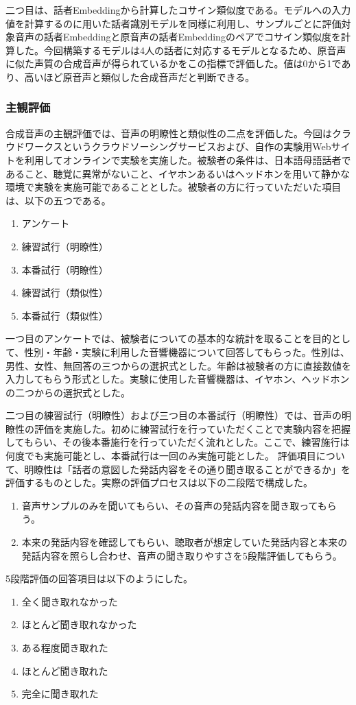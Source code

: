 \documentclass[12pt]{jarticle}
\numberwithin{equation}{section}    %
\numberwithin{figure}{section}      %
\numberwithin{table}{section}      %
\begin{document}
二つ目は、話者Embeddingから計算したコサイン類似度である。モデルへの入力値を計算するのに用いた話者識別モデルを同様に利用し、サンプルごとに評価対象音声の話者Embeddingと原音声の話者Embeddingのペアでコサイン類似度を計算した。今回構築するモデルは4人の話者に対応するモデルとなるため、原音声に似た声質の合成音声が得られているかをこの指標で評価した。値は0から1であり、高いほど原音声と類似した合成音声だと判断できる。

\subsubsection{主観評価}
合成音声の主観評価では、音声の明瞭性と類似性の二点を評価した。今回はクラウドワークスというクラウドソーシングサービスおよび、自作の実験用Webサイトを利用してオンラインで実験を実施した。被験者の条件は、日本語母語話者であること、聴覚に異常がないこと、イヤホンあるいはヘッドホンを用いて静かな環境で実験を実施可能であることとした。被験者の方に行っていただいた項目は、以下の五つである。
\begin{enumerate}
    \item アンケート
    \item 練習試行（明瞭性）
    \item 本番試行（明瞭性）
    \item 練習試行（類似性）
    \item 本番試行（類似性）
\end{enumerate}

一つ目のアンケートでは、被験者についての基本的な統計を取ることを目的として、性別・年齢・実験に利用した音響機器について回答してもらった。性別は、男性、女性、無回答の三つからの選択式とした。年齢は被験者の方に直接数値を入力してもらう形式とした。実験に使用した音響機器は、イヤホン、ヘッドホンの二つからの選択式とした。

二つ目の練習試行（明瞭性）および三つ目の本番試行（明瞭性）では、音声の明瞭性の評価を実施した。初めに練習試行を行っていただくことで実験内容を把握してもらい、その後本番施行を行っていただく流れとした。ここで、練習施行は何度でも実施可能とし、本番試行は一回のみ実施可能とした。
評価項目について、明瞭性は「話者の意図した発話内容をその通り聞き取ることができるか」を評価するものとした。実際の評価プロセスは以下の二段階で構成した。
\begin{enumerate}
    \item 音声サンプルのみを聞いてもらい、その音声の発話内容を聞き取ってもらう。
    \item 本来の発話内容を確認してもらい、聴取者が想定していた発話内容と本来の発話内容を照らし合わせ、音声の聞き取りやすさを5段階評価してもらう。
\end{enumerate}
5段階評価の回答項目は以下のようにした。
\begin{enumerate}
    \item 全く聞き取れなかった
    \item ほとんど聞き取れなかった
    \item ある程度聞き取れた
    \item ほとんど聞き取れた
    \item 完全に聞き取れた
\end{enumerate}
\end{document}
